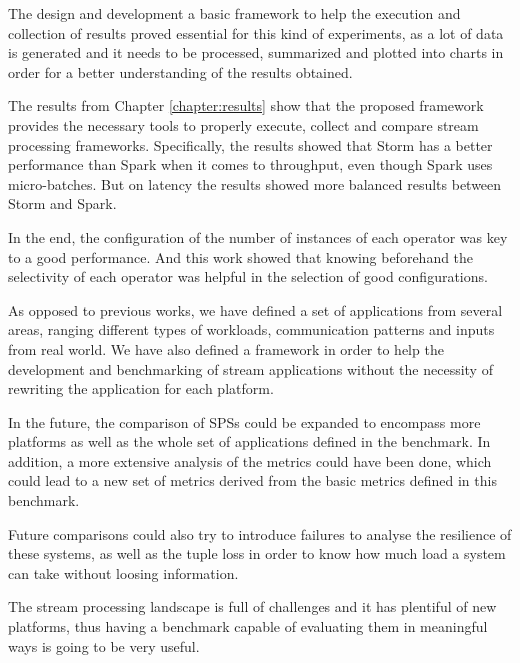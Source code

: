 \documentclass[ppgc,diss,english]{iiufrgs}
\begin{document}
The design and development a basic framework to help the execution and collection of results proved essential for this kind of experiments, as a lot of data is generated and it needs to be processed, summarized and plotted into charts in order for a better understanding of the results obtained.

The results from Chapter \ref{chapter:results} show that the proposed framework provides the necessary tools to properly execute, collect and compare stream processing frameworks. Specifically, the results showed that Storm has a better performance than Spark when it comes to throughput, even though Spark uses micro-batches. But on latency the results showed more balanced results between Storm and Spark.

In the end, the configuration of the number of instances of each operator was key to a good performance. And this work showed that knowing beforehand the selectivity of each operator was helpful in the selection of good configurations.

As opposed to previous works, we have defined a set of applications from several areas, ranging different types of workloads, communication patterns and inputs from real world. We have also defined a framework in order to help the development and benchmarking of stream applications without the necessity of rewriting the application for each platform.

In the future, the comparison of SPSs could be expanded to encompass more platforms as well as the whole set of applications defined in the benchmark. In addition, a more extensive analysis of the metrics could have been done, which could lead to a new set of metrics derived from the basic metrics defined in this benchmark.

Future comparisons could also try to introduce failures to analyse the resilience of these systems, as well as the tuple loss in order to know how much load a system can take without loosing information.

The stream processing landscape is full of challenges and it has plentiful of new platforms, thus having a benchmark capable of evaluating them in meaningful ways is going to be very useful.




\end{document}

